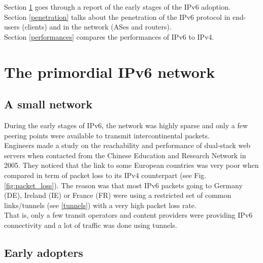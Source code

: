 \documentclass[journal]{IEEEtran}
\begin{document}
Section \ref{primordial} goes through a report of the early stages of the IPv6
adoption. \\
Section \ref{penetration} talks about the penetration of the IPv6 protocol
in end-users (clients) and in the network (ASes and routers). \\
Section \ref{performances} compares the performances of IPv6 to IPv4.

\section{The primordial IPv6 network}
\label{primordial}

\subsection{A small network}

During the early stages of IPv6, the network was highly sparse and only a few
peering points were available to transmit intercontinental packets. \\
Engineers made a study on the reachability and performance of dual-stack web
servers when contacted from the Chinese Education and Research Network in
2005\cite{paper1}. They noticed that the link to some European countries was
very poor when compared in term of packet loss to its IPv4 counterpart
(see Fig. \ref{fig:packet_loss}). The reason was that most IPv6 packets going
to Germany (DE), Ireland (IE) or France (FR) were using a restricted set of
common links/tunnels (see \ref{tunnels}) with a very high packet loss rate. \\
That is, only a few transit operators and content providers were providing IPv6
connectivity and a lot of traffic was done using tunnels.

\subsection{Early adopters}
\label{early}
\end{document}
